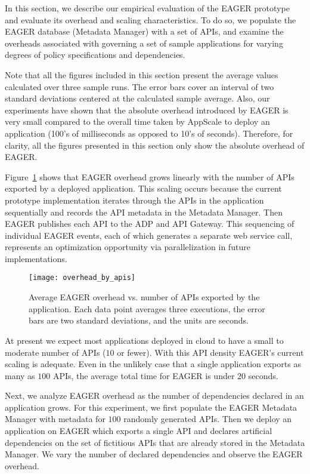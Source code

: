 In this section, we describe our empirical evaluation of the EAGER
prototype and evaluate its overhead and scaling characteristics.
To do so, we populate the EAGER database (Metadata Manager) with a 
set of APIs, and examine
the overheads associated with governing a set of sample applications 
for varying degrees of policy specifications and dependencies.

Note that all the figures included in this section present the average values calculated
over three sample runs. The error bars cover an interval of two standard deviations centered
at the calculated sample average. Also, our experiments have shown that the absolute
overhead introduced by EAGER is very small compared to the overall time taken by
AppScale to deploy an application (100's of milliseconds as opposed
to 10's of seconds). Therefore, for clarity, all the figures presented in this section only show the
absolute overhead of EAGER.

Figure~\ref{fig:overhead_by_apis} shows that EAGER overhead grows linearly
with the number of APIs exported by a deployed application.  This scaling occurs
because the current prototype implementation iterates through the APIs in the
application sequentially and records the API metadata in the Metadata Manager.
Then EAGER publishes each API to the ADP and API Gateway. This sequencing of
individual EAGER events, each of which generates a separate web service call,
represents an optimization opportunity via parallelization in future implementations.

\begin{figure}
\centering
\texttt{[image: overhead\_by\_apis]}
\caption{Average EAGER overhead vs. number of APIs exported by the
application.  Each data point averages three executions, the error bars 
are two standard deviations, and the units are seconds.}
\label{fig:overhead_by_apis}
\vspace{-0.2in}
\end{figure}

At present we expect most applications deployed in cloud to have a small to 
moderate number of APIs ($10$ or fewer).  With this API density EAGER's current 
scaling is adequate.  Even in the
unlikely case that a single application exports as many as $100$ APIs,
the average total time for EAGER is under $20$ seconds.

Next, we analyze EAGER overhead as the number of dependencies declared in
an application grows. For this experiment, we first populate the EAGER
Metadata Manager with metadata for $100$ randomly 
generated APIs.
Then we
deploy an application on EAGER which exports a single API and declares
artificial dependencies on the set of fictitious 
APIs that are already stored in the Metadata Manager. We
vary the number of declared dependencies and observe the EAGER overhead.

